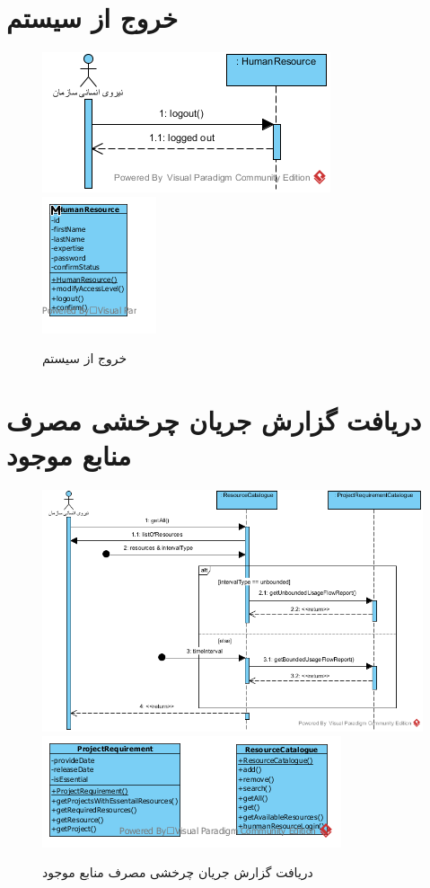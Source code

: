 \section{خروج از سیستم}
\begin{figure}[H]
	\centering
	\includegraphics[scale=0.8]{img/sequence-analysis/SignOut}
	\includegraphics[scale=0.8]{img/sequence-analysis/SignOutC}
	\caption{خروج از سیستم}
\end{figure}


\section{دریافت گزارش جریان چرخشی مصرف منابع موجود}
\begin{figure}[H]
	\centering
	\includegraphics[scale=0.7]{img/sequence-analysis/UsageFlowReport}
	\includegraphics[scale=0.7]{img/sequence-analysis/UsageFlowReportC}
	\caption{دریافت گزارش جریان چرخشی مصرف منابع موجود}
\end{figure}

